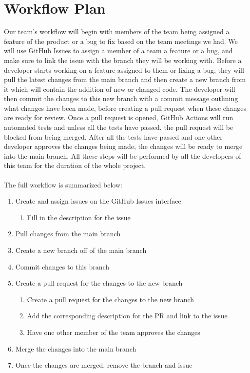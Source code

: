\documentclass{article}
\begin{document}
\section{Workflow Plan}
Our team’s workflow will begin with members of the team being assigned a feature of the product or a bug to fix based on the team meetings we had. We will use GitHub Issues to assign a member of a team a feature or a bug, and make sure to link the issue with the branch they will be working with.  Before a developer starts working on a feature assigned to them or fixing a bug, they will pull the latest changes from the main branch and then create a new branch from it which will contain the addition of new or changed code. The developer will then commit the changes to this new branch with a commit message outlining what changes have been made, before creating a pull request when these changes are ready for review. Once a pull request is opened, GitHub Actions will run automated tests and unless all the tests have passed, the pull request will be blocked from being merged. After all the tests have passed and one other developer approves the changes being made, the changes will be ready to merge into the main branch. All these steps will be performed by all the developers of this team for the duration of the whole project.
\\
\\
The full workflow is summarized below:
\begin{enumerate}
	\item Create and assign issues on the GitHub Issues interface
  \begin{enumerate}
    \item Fill in the description for the issue
  \end{enumerate}
	\item Pull changes from the main branch
  \item Create a new branch off of the main branch
  \item Commit changes to this branch
  \item Create a pull request for the changes to the new branch
  \begin{enumerate}
    \item Create a pull request for the changes to the new branch
    \item Add the corresponding description for the PR and link to the issue
    \item Have one other member of the team approves the changes
  \end{enumerate}
  \item Merge the changes into the main branch
  \item Once the changes are merged, remove the branch and issue
\end{enumerate}
\end{document}
